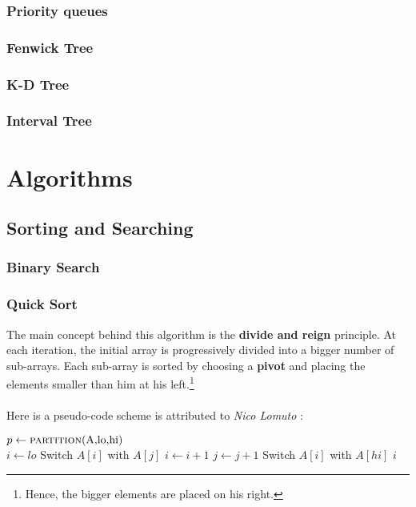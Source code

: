 \documentclass[10pt,landscape,twocolumn]{article}
\begin{document}
\subsubsection{Priority queues}
\subsubsection{Fenwick Tree}
\subsubsection{K-D Tree}
\subsubsection{Interval Tree}

\section{Algorithms}

\subsection{Sorting and Searching}

\subsubsection{Binary Search}
\subsubsection{Quick Sort}

The main concept behind this algorithm is the \textbf{divide and reign} principle.  At each iteration, the initial array is progressively divided into a bigger number of sub-arrays. Each sub-array is sorted by choosing a \textbf{pivot} and placing the elements smaller than him at his left.\footnote{Hence, the bigger elements are placed on his right.} \\ \\
Here is a pseudo-code scheme is attributed to \textit{Nico Lomuto} :
\begin{algorithmic}[1]
\State $p \gets \Call {partition}{$A,lo,hi$} $ 
\State {} 
\State {} 
\EndFunction
\\
	\State $i \gets lo$ 
			\State Switch $A[i]$ with $A[j]$
			\State $i \gets i+1$
		\EndIf
		\State $j \gets j+1$
	\EndFor
	\State Switch $A[i]$ with $A[hi]$
	\Return $i$
\EndFunction
\end{algorithmic}
\end{document}

